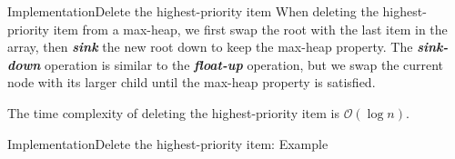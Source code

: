 \documentclass[aspectratio=169]{ctexbeamer}
\newcommand{\highlight}[1]{\textbf{\textit{#1}}}
\begin{document}
    \begin{frame}{Implementation}{Delete the highest-priority item}
        When deleting the highest-priority item from a max-heap, we first swap the root with the last item in the array, then \highlight{sink} the new root down to keep the max-heap property. The \highlight{sink-down} operation is similar to the \highlight{float-up} operation, but we swap the current node with its larger child until the max-heap property is satisfied.

        The time complexity of deleting the highest-priority item is $\mathcal O(\log n)$.
    \end{frame}

    \begin{frame}{Implementation}{Delete the highest-priority item: Example}
        \begin{figure}
        \end{figure}
    \end{frame}
\end{document}
